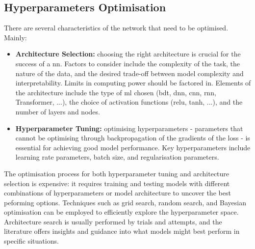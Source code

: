 \subsection{Hyperparameters Optimisation}
There are several characteristics of the network that need to be optimised. Mainly: 
\begin{itemize}
    \item \textbf{Architecture Selection:} choosing the right architecture is crucial for the success of a \gls{nn}. Factors to consider include the complexity of the task, the nature of the data, and the desired trade-off between model complexity and interpretability. Limits in computing power should be factored in. Elements of the architecture include the type of \gls{ml} chosen (\gls{bdt}, \gls{dnn}, \gls{cnn}, \gls{rnn}, Transformer, ...), the choice of activation functions (\gls{relu}, tanh, ...), and the number of layers and nodes.
    \item \textbf{Hyperparameter Tuning:} optimising hyperparameters - parameters that cannot be optimising through backpropagation of the gradients of the loss - is essential for achieving good model performance. Key hyperparameters include learning rate parameters, batch size, and regularisation parameters.
\end{itemize}
The optimisation process for both hyperparameter tuning and architecture selection is expensive: it requires training and testing models with different combinations of hyperparameters or model architecture to uncover the best peforming options. Techniques such as grid search, random search, and Bayesian optimisation can be employed to efficiently explore the hyperparameter space. Architecture search is usually performed by trials and attempts, and the literature offers insights and guidance into what models might best perform in specific situations. 

